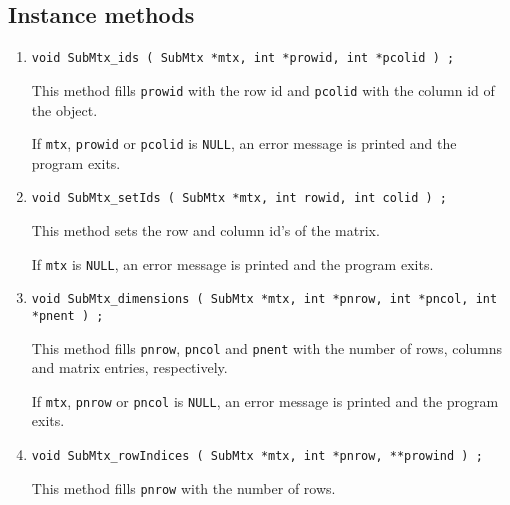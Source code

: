 \subsection{Instance methods}
\label{subsection:SubMtx:proto:instance}
\par
\begin{enumerate}
\item
\begin{verbatim}
void SubMtx_ids ( SubMtx *mtx, int *prowid, int *pcolid ) ;
\end{verbatim}
This method fills {\tt *prowid} with the row id 
and {\tt *pcolid} with the column id of the object.
\par {}
If {\tt mtx}, {\tt prowid} or {\tt pcolid} is {\tt NULL},
an error message is printed and the program exits.
\item
\begin{verbatim}
void SubMtx_setIds ( SubMtx *mtx, int rowid, int colid ) ;
\end{verbatim}
This method sets the row and column id's of the matrix.
\par {}
If {\tt mtx} is {\tt NULL},
an error message is printed and the program exits.
\item
\begin{verbatim}
void SubMtx_dimensions ( SubMtx *mtx, int *pnrow, int *pncol, int *pnent ) ;
\end{verbatim}
This method 
fills {\tt *pnrow}, {\tt *pncol} and {\tt *pnent}
with the number of rows, columns and matrix entries, respectively.
\par {}
If {\tt mtx}, {\tt pnrow} or {\tt pncol} is {\tt NULL},
an error message is printed and the program exits.
\item
\begin{verbatim}
void SubMtx_rowIndices ( SubMtx *mtx, int *pnrow, **prowind ) ;
\end{verbatim}
This method fills {\tt *pnrow} with the number of rows.

\end{enumerate}
